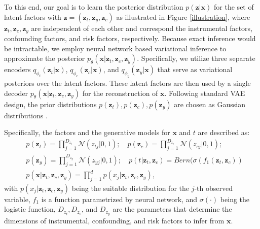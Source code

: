 \documentclass[letterpaper]{article} %
\begin{document}
To this end, our goal is to learn the posterior distribution $p(\mathbf{z}|\mathbf{x})$ for the set of latent factors  with $\mathbf{z}= (\mathbf{z}_t, \mathbf{z}_y, \mathbf{z}_c)$ as illustrated in Figure \ref{illustration}, where $\mathbf{z}_t,\mathbf{z}_c, \mathbf{z}_y$ are independent of each other and correspond the instrumental factors, confounding factors, and risk factors, respectively.
Because exact inference would be intractable, we employ neural network based variational inference to approximate the posterior $p_\theta(\mathbf{x}|\mathbf{z}_t, \mathbf{z}_c, \mathbf{z}_y)$. Specifically, we utilize three separate encoders $q_{\phi_t}(\mathbf{z}_t|\mathbf{x})$, $q_{\phi_c}(\mathbf{z}_c|\mathbf{x})$, and $q_{\phi_y}(\mathbf{z}_y|\mathbf{x})$ that serve as variational posteriors over the latent factors. 
These latent factors are then used by a single decoder $p_\theta(\mathbf{x}|\mathbf{z}_t,\mathbf{z}_c, \mathbf{z}_y)$ for the reconstruction of $\mathbf{x}$. Following standard VAE design, the prior distributions $p(\mathbf{z}_t),p(\mathbf{z}_c),p(\mathbf{z}_y)$ are chosen as Gaussian distributions \cite{Kingma2014}. 

Specifically, the factors and the generative models for $\mathbf{x}$ and $t$ are described as:
\begin{align}
&p(\mathbf{z}_t) = \prod\limits_{j=1}^{D_{z_t}} \mathcal{N}(z_{tj}|0,1);\quad
p(\mathbf{z}_c) = \prod\limits_{j=1}^{D_{z_c}} \mathcal{N}(z_{cj}|0,1); \nonumber\\
&p(\mathbf{z}_y) = \prod\limits_{j=1}^{D_{z_y}} \mathcal{N}(z_{yj}|0,1);\quad p(t|\mathbf{z}_t,\mathbf{z}_c) = Bern(\sigma(f_1(\mathbf{z}_t,\mathbf{z}_c))\nonumber\\
& p(\mathbf{x}|\mathbf{z}_t,\mathbf{z}_c, \mathbf{z}_y) = \prod\limits_{j=1}^{d} p(x_j|\mathbf{z}_t,\mathbf{z}_c, \mathbf{z}_y),
\end{align}
with $p(x_j|\mathbf{z}_t,\mathbf{z}_c, \mathbf{z}_y)$ being the suitable distribution for the $j$-th observed variable, $f_1$ is a function parametrized by neural network, and $\sigma(\cdot)$ being the logistic function, $D_{z_t},D_{z_c}$, and $D_{z_y}$ are the parameters that determine the dimensions of instrumental, confounding, and risk factors to infer from $\mathbf{x}$. 
\end{document}
